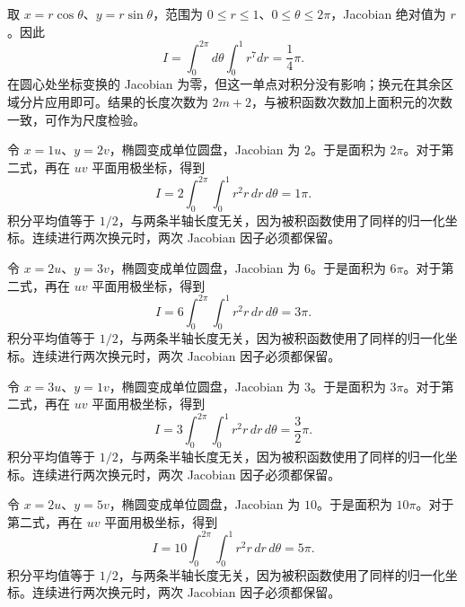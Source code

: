 \documentclass[12pt,fontset=fandol]{ctexart}
\begin{document}
\begin{solve}\label{ans:c36q19}
取 $x=r\cos\theta$、$y=r\sin\theta$，范围为 $0\le r\le 1$、$0\le\theta\le2\pi$，Jacobian 绝对值为 $r$。因此
\[
I=\int_0^{2\pi}d\theta\int_0^{1}r^{7}dr=\frac{1}{4}\pi.
\]
在圆心处坐标变换的 Jacobian 为零，但这一单点对积分没有影响；换元在其余区域分片应用即可。结果的长度次数为 $2m+2$，与被积函数次数加上面积元的次数一致，可作为尺度检验。
\end{solve}

\begin{solve}\label{ans:c36q20}
令 $x=1u$、$y=2v$，椭圆变成单位圆盘，Jacobian 为 $2$。于是面积为 $2\pi$。对于第二式，再在 $uv$ 平面用极坐标，得到
\[
I=2\int_0^{2\pi}\int_0^1r^2r\,dr\,d\theta=1\pi.
\]
积分平均值等于 $1/2$，与两条半轴长度无关，因为被积函数使用了同样的归一化坐标。连续进行两次换元时，两次 Jacobian 因子必须都保留。
\end{solve}

\begin{solve}\label{ans:c36q21}
令 $x=2u$、$y=3v$，椭圆变成单位圆盘，Jacobian 为 $6$。于是面积为 $6\pi$。对于第二式，再在 $uv$ 平面用极坐标，得到
\[
I=6\int_0^{2\pi}\int_0^1r^2r\,dr\,d\theta=3\pi.
\]
积分平均值等于 $1/2$，与两条半轴长度无关，因为被积函数使用了同样的归一化坐标。连续进行两次换元时，两次 Jacobian 因子必须都保留。
\end{solve}

\begin{solve}\label{ans:c36q22}
令 $x=3u$、$y=1v$，椭圆变成单位圆盘，Jacobian 为 $3$。于是面积为 $3\pi$。对于第二式，再在 $uv$ 平面用极坐标，得到
\[
I=3\int_0^{2\pi}\int_0^1r^2r\,dr\,d\theta=\frac{3}{2}\pi.
\]
积分平均值等于 $1/2$，与两条半轴长度无关，因为被积函数使用了同样的归一化坐标。连续进行两次换元时，两次 Jacobian 因子必须都保留。
\end{solve}

\begin{solve}\label{ans:c36q23}
令 $x=2u$、$y=5v$，椭圆变成单位圆盘，Jacobian 为 $10$。于是面积为 $10\pi$。对于第二式，再在 $uv$ 平面用极坐标，得到
\[
I=10\int_0^{2\pi}\int_0^1r^2r\,dr\,d\theta=5\pi.
\]
积分平均值等于 $1/2$，与两条半轴长度无关，因为被积函数使用了同样的归一化坐标。连续进行两次换元时，两次 Jacobian 因子必须都保留。
\end{solve}
\end{document}
